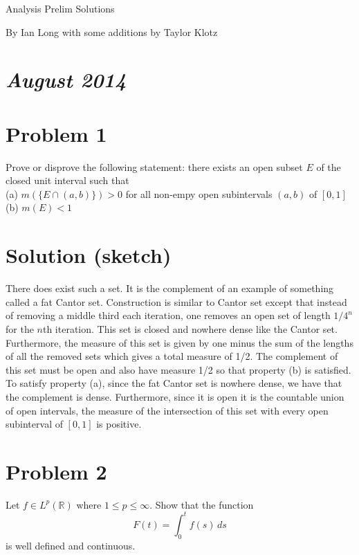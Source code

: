 \documentclass{article}
\newcommand{\field}[1]{\mathbb{#1}}
\begin{document}
\newtheorem{name}{Printed output}
\newtheorem{mydef}{Definition}
\newcommand{\T}{\mathcal{T}}
\newenvironment{definition}[1][Definition]{\begin{trivlist}
\item[\hskip \labelsep {\bfseries #1}]}{\end{trivlist}}
\newenvironment{example}[1][Example]{\begin{trivlist}
\item[\hskip \labelsep {\bfseries #1}]}{\end{trivlist}}

\newtheorem{theorem}{Theorem}[section]
\centerline{\sc Analysis Prelim Solutions}
\centerline{\sc By Ian Long with some additions by Taylor Klotz}



\section*{{\it August 2014}}
\section*{Problem 1}
Prove or disprove the following statement: there exists an open subset $E$ of the closed unit interval such that\\
(a)  $m(\{E\cap(a,b)\})>0$ for all non-empy open subintervals $(a,b)$ of $[0,1]$\\
(b) $m(E)<1$
\section*{Solution (sketch)}
There does exist such a set. It is the complement of an example of something called a fat Cantor set. Construction is similar to Cantor set except that instead of removing a middle third each iteration, one removes an open set of length $1/4^n$ for the $n$th iteration. This set is closed and nowhere dense like the Cantor set. Furthermore, the measure of this set is given by one minus the sum of the lengths of all the removed sets which gives a total measure of 1/2. The complement of this set must be open and also have measure 1/2 so that property (b) is satisfied. To satisfy property (a), since the fat Cantor set is nowhere dense, we have that the complement is dense. Furthermore, since it is open it is the countable union of open intervals, the measure of the intersection of this set with every open subinterval of $[0,1]$ is positive.
\section*{Problem 2}
Let $f\in L^p(\field{R})$ where $1\leq p\leq\infty$. Show that the function 
$$F(t)=\int_0^t f(s)\,ds$$
is well defined and continuous.
\end{document}
